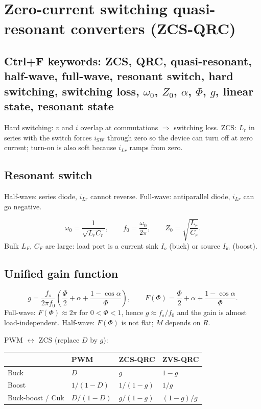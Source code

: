 \section{Zero-current switching quasi-resonant converters (ZCS-QRC)}

\subsection{Ctrl+F keywords: ZCS, QRC, quasi-resonant, half-wave, full-wave, resonant switch, hard switching, switching loss, \(\omega_0\), \(Z_0\), \(\alpha\), \(\Phi\), \(g\), linear state, resonant state}

Hard switching: \(v\) and \(i\) overlap at commutations \(\Rightarrow\) switching loss. ZCS: \(L_r\) in series with the switch forces \(i_{\mathrm{SW}}\) through zero so the device can turn off at zero current; turn-on is also soft because \(i_{Lr}\) ramps from zero.

\subsection{Resonant switch}
Half-wave: series diode, \(i_{Lr}\) cannot reverse. Full-wave: antiparallel diode, \(i_{Lr}\) can go negative.

\[
\omega_0=\frac{1}{\sqrt{L_r C_r}},\qquad f_0=\frac{\omega_0}{2\pi},\qquad Z_0=\sqrt{\frac{L_r}{C_r}}.
\]
Bulk \(L_F\), \(C_F\) are large: load port is a current sink \(I_o\) (buck) or source \(I_{\mathrm{in}}\) (boost).

\subsection{Unified gain function}
\[
g=\frac{f_s}{2\pi f_0}\left(\frac{\Phi}{2}+\alpha+\frac{1-\cos\alpha}{\Phi}\right),\qquad
F(\Phi)=\frac{\Phi}{2}+\alpha+\frac{1-\cos\alpha}{\Phi}.
\]
Full-wave: \(F(\Phi)\approx 2\pi\) for \(0<\Phi<1\), hence \(g\approx f_s/f_0\) and the gain is almost load-independent. Half-wave: \(F(\Phi)\) is not flat; \(M\) depends on \(R\).

PWM \(\leftrightarrow\) ZCS (replace \(D\) by \(g\)):
\begin{center}
\begin{tabular}{@{}llll@{}}
\toprule
 & PWM & ZCS-QRC & ZVS-QRC\\
\midrule
Buck & \(D\) & \(g\) & \(1-g\)\\
Boost & \(1/(1-D)\) & \(1/(1-g)\) & \(1/g\)\\
Buck-boost / Cuk & \(D/(1-D)\) & \(g/(1-g)\) & \((1-g)/g\)\\
\bottomrule
\end{tabular}
\end{center}

